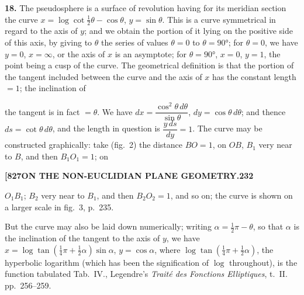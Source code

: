 \documentclass[11pt,a4paper]{book}
\begin{document}
\medskip

\noindent\textbf{18.} The pseudosphere is a surface of revolution having for its meridian section the curve $x = \log\cot\tfrac{1}{2}\theta - \cos\theta$, $y = \sin\theta$. This is a curve symmetrical in regard to the axis of $y$; and we obtain the portion of it lying on the positive side of this axis, by giving to $\theta$ the series of values $\theta = 0$ to $\theta = 90°$; for $\theta = 0$, we have $y = 0$, $x = \infty$, or the axis of $x$ is an asymptote; for $\theta = 90°$, $x = 0$, $y = 1$, the point being a cusp of the curve. The geometrical definition is that the portion of the tangent included between the curve and the axis of $x$ has the constant length $= 1$; the inclination of

\begin{figure}[H]
\centering
{}
\end{figure}

\noindent the tangent is in fact $= \theta$. We have $dx = \dfrac{\cos^2\theta\, d\theta}{\sin\theta}$, $dy = \cos\theta\, d\theta$; and thence $ds = \cot\theta\, d\theta$, and the length in question is $\dfrac{y\, ds}{dy} = 1$. The curve may be constructed graphically: take (fig.~2) the distance $BO = 1$, on $OB$, $B_1$ very near to $B$, and then $B_1O_1 = 1$; on

\newpage
\setcounter{page}{232}

\noindent\textbf{[827}\hfill\textbf{ON THE NON-EUCLIDIAN PLANE GEOMETRY.}\hfill\textbf{232}

\bigskip

\noindent $O_1B_1$; $B_2$ very near to $B_1$, and then $B_2O_2 = 1$, and so on; the curve is shown on a larger scale in fig.~3, p.~235.

But the curve may also be laid down numerically; writing $\alpha = \frac{1}{2}\pi - \theta$, so that $\alpha$ is the inclination of the tangent to the axis of $y$, we have $x = \log\tan(\frac{1}{4}\pi + \frac{1}{2}\alpha)\sin\alpha$, $y = \cos\alpha$, where $\log\tan(\frac{1}{4}\pi + \frac{1}{2}\alpha)$, the hyperbolic logarithm (which has been the signification of $\log$ throughout), is the function tabulated Tab.~IV., Legendre's \textit{Trait\'e des Fonctions Elliptiques}, t.~II. pp.~256--259.
\end{document}

